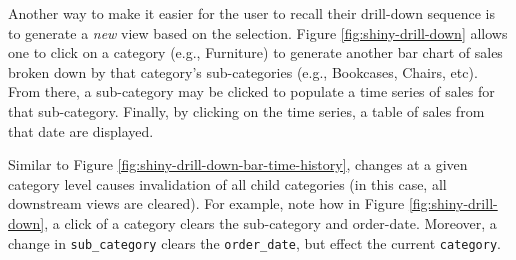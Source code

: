 \documentclass[
  12pt,
]{krantz}
\begin{document}
Another way to make it easier for the user to recall their drill-down sequence is to generate a \emph{new} view based on the selection. Figure \ref{fig:shiny-drill-down} allows one to click on a category (e.g., Furniture) to generate another bar chart of sales broken down by that category's sub-categories (e.g., Bookcases, Chairs, etc). From there, a sub-category may be clicked to populate a time series of sales for that sub-category. Finally, by clicking on the time series, a table of sales from that date are displayed.

Similar to Figure \ref{fig:shiny-drill-down-bar-time-history}, changes at a given category level causes invalidation of all child categories (in this case, all downstream views are cleared). For example, note how in Figure \ref{fig:shiny-drill-down}, a click of a category clears the sub-category and order-date. Moreover, a change in \texttt{sub\_category} clears the \texttt{order\_date}, but effect the current \texttt{category}.

\end{document}
